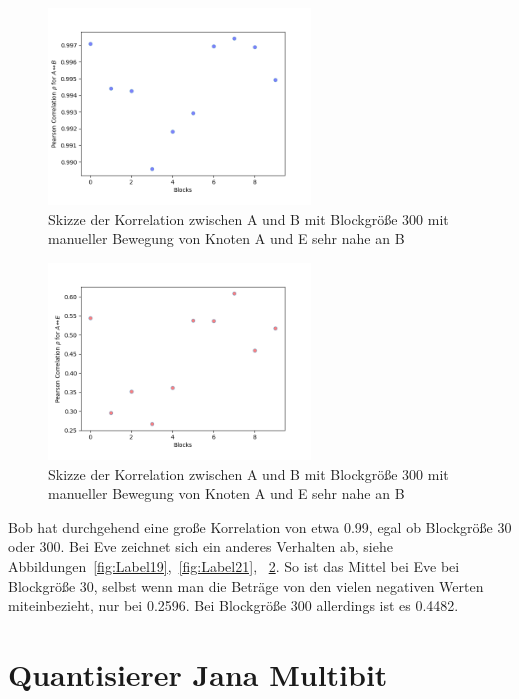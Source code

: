 \documentclass[12pt,a4paper]{article}
\begin{document}
\begin{figure}[hbt!]
	\centering
		\includegraphics[width=0.62\textwidth ]
		{Bilder/a3-t5-block300-correlation-AB.png}
		\caption{Skizze der Korrelation zwischen A und B mit Blockgröße 300 mit manueller Bewegung von Knoten A und E sehr nahe an B}
		\label{fig:Label22}
\end{figure}

\begin{figure}[hbt!]
	\centering
		\includegraphics[width=0.62\textwidth ]
		{Bilder/a3-t5-block300-correlation-AE.png}
		\caption{Skizze der Korrelation zwischen A und B mit Blockgröße 300 mit manueller Bewegung von Knoten A und E sehr nahe an B}
		\label{fig:Label23}
\end{figure}


Bob hat durchgehend eine große Korrelation von
etwa 0.99, egal ob Blockgröße 30 oder 300. Bei Eve zeichnet sich ein 
anderes Verhalten ab, siehe Abbildungen~\ref{fig:Label19},~\ref{fig:Label21},
~\ref{fig:Label23}. So ist das Mittel bei Eve bei Blockgröße 30, selbst 
wenn man die Beträge von den vielen negativen Werten miteinbezieht, nur 
bei 0.2596. Bei Blockgröße 300 allerdings ist es 0.4482.


\newpage
\section{Quantisierer Jana Multibit}
\end{document}

